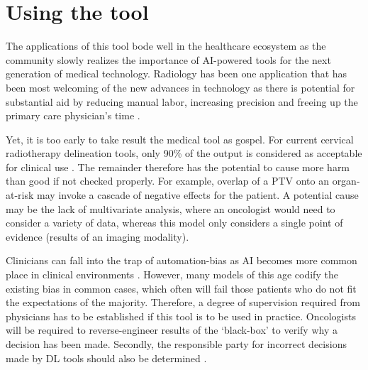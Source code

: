 \documentclass[11pt,twoside]{report}
\begin{document}
\section{Using the tool}

The applications of this tool bode well in the healthcare ecosystem as the community slowly realizes the importance of AI-powered tools for the next generation of medical technology. Radiology has been one application that has been most welcoming of the new advances in technology as there is potential for substantial aid by reducing manual labor, increasing precision and freeing up the primary care physician's time \cite{overview-of-ai-medicine}.

Yet, it is too early to take result the medical tool as gospel. For current cervical radiotherapy delineation tools, only 90\% of the output is considered as acceptable for clinical use \cite{auto-delineation-cervical-cancer-development}. The remainder therefore has the potential to cause more harm than good if not checked properly. For example, overlap of a PTV onto an organ-at-risk may invoke a cascade of negative effects for the patient. A potential cause may be the lack of multivariate analysis, where an oncologist would need to consider a variety of data, whereas this model only considers a single point of evidence (results of an imaging modality).

Clinicians can fall into the trap of automation-bias as AI becomes more common place in clinical environments \cite{automation-bias}. However, many models of this age codify the existing bias in common cases, which often will fail those patients who do not fit the expectations of the majority. Therefore, a degree of supervision required from physicians has to be established if this tool is to be used in practice. Oncologists will be required to reverse-engineer results of the `black-box' to verify why a decision has been made. Secondly, the responsible party for incorrect decisions made by DL tools should also be determined \cite{AI-in-cancer-diagnosis-era}.

\printbibliography
{}
\end{document}
